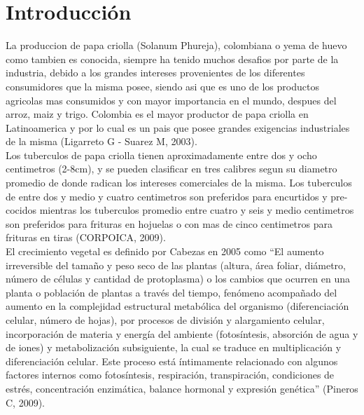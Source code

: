 

\chapter*{Introducci\'on}

La produccion de papa criolla (Solanum Phureja), colombiana o yema de huevo como tambien es conocida, siempre ha tenido muchos desafios por parte de la industria, debido a los grandes intereses provenientes de los diferentes consumidores que la misma posee, siendo asi que es uno de los productos agricolas mas consumidos y con mayor importancia en el mundo, despues del arroz, maiz y trigo. Colombia es el mayor productor de papa criolla en Latinoamerica y por lo cual es un pais que posee grandes exigencias industriales de la misma (Ligarreto G - Suarez M, 2003).\\

Los tuberculos de papa criolla tienen aproximadamente entre dos y ocho centimetros (2-8cm), y se pueden clasificar en tres calibres segun su diametro promedio de donde radican los intereses comerciales de la misma. Los tuberculos de entre dos y medio y cuatro centimetros son preferidos para encurtidos y pre-cocidos mientras los tuberculos promedio entre cuatro y seis y medio centimetros son preferidos para frituras en hojuelas o con mas de cinco centimetros para frituras en tiras (CORPOICA, 2009).\\

El crecimiento vegetal es definido por Cabezas en 2005 como "`El aumento irreversible del tamaño y peso seco de las plantas (altura, área foliar, diámetro, número de células y cantidad de protoplasma) o los cambios que ocurren en una planta o población de plantas a través del tiempo, fenómeno acompañado del aumento en la complejidad estructural metabólica del organismo (diferenciación celular, número de hojas), por procesos de división y alargamiento celular, incorporación de materia y energía del ambiente (fotosíntesis, absorción de agua y de iones) y metabolización subsiguiente, la cual se traduce en multiplicación y diferenciación celular. Este proceso está íntimamente relacionado con algunos factores internos como fotosíntesis, respiración, transpiración, condiciones de estrés, concentración enzimática, balance hormonal y expresión genética"' (Pineros C, 2009).\\

